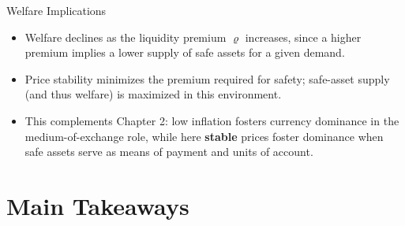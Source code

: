\documentclass[11pt,aspectratio=169]{beamer}
\begin{document}
\begin{frame}{Welfare Implications}
\small
\begin{itemize}

  \item Welfare declines as the liquidity premium $\varrho$ increases, since a higher premium implies a lower supply of safe assets for a given demand.

  \vspace{0.6em}

  \item Price stability minimizes the premium required for safety; safe-asset supply (and thus welfare) is maximized in this environment.

  \vspace{0.6em}

  \item This complements Chapter 2: low inflation fosters currency dominance in the medium-of-exchange role, while here \textbf{stable} prices foster dominance when safe assets serve as means of payment and units of account.

\end{itemize}
\end{frame}



\section{Main Takeaways}
\end{document}

